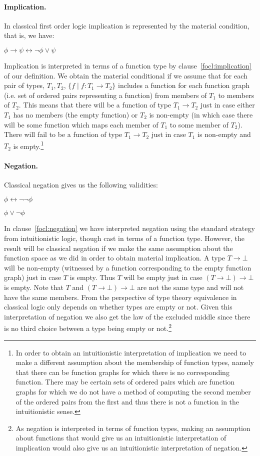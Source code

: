 \paragraph{Implication.}  In classical first order logic implication
is represented by the material condition, that is, we have:
\begin{display}
$\phi\rightarrow\psi \leftrightarrow \neg\phi\vee\psi$
\end{display}
Implication is interpreted in terms of a function type by
clause~\ref{focl:implication} of our definition.  We obtain the
material conditional if we assume that for each pair of types, $T_1,T_2$,
$\{f\mid f:T_1\rightarrow T_2\}$ includes a function for each function
graph (i.e. set of ordered pairs representing a function) from members
of $T_1$ to members of $T_2$.  This means that there will be a
function of type $T_1\rightarrow T_2$ just in case either $T_1$ has no
members (the empty function) or $T_2$ is non-empty (in which case
there will be some function which maps each member of $T_1$ to some
member of $T_2$).  There will fail to be a function of type
$T_1\rightarrow T_2$ just in case $T_1$ is non-empty and $T_2$ is
empty.\footnote{In order to obtain an intuitionistic interpretation of
  implication we need to make a different assumption about the
  membership of function types, namely that there can be function
  graphs for which there is no corresponding function.  There may be
  certain sets of ordered pairs which are function graphs for which we
  do not have a method of computing the second member of the ordered
  pairs from the first and thus there is not a function in the
  intuitionistic sense.}

\paragraph{Negation.}  Classical negation gives us the following
validities:
\begin{display}
$\phi\leftrightarrow\neg\neg\phi$

$\phi\vee\neg\phi$

\end{display}
In clause~\ref{focl:negation} we have interpreted negation using the
standard strategy from intuitionistic logic, though cast in terms of a
function type.  However, the result will be classical negation if we
make the same assumption about the function space as we did in order
to obtain material implication.  A type $T\rightarrow\bot$ will be
non-empty (witnessed by a function corresponding to the empty function
graph) just in case $T$ is empty.  Thus $T$ will be empty just in case
$(T\rightarrow\bot)\rightarrow\bot$ is empty.  Note that $T$ and
$(T\rightarrow\bot)\rightarrow\bot$ are not the same type and will not
have the same members.  From the perspective of type theory
equivalence in classical logic only depends on whether types are empty
or not.  Given this interpretation of negation we also get the law of
the excluded middle since there is no third choice between a type
being empty or not.\footnote{As negation is interpreted in terms of
  function types, making an assumption about functions that would give
  us an intuitionistic interpretation of implication would also give
  us an intuitionistic interpretation of negation.}


